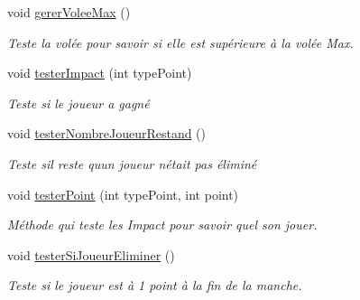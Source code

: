 \begin{DoxyCompactItemize}
void \hyperlink{class_darts_a1bd32af08207f7465f2973821a25dbae}{gerer\+Volee\+Max} ()
\begin{DoxyCompactList}\small\item\em Teste la volée pour savoir si elle est supérieure à la volée Max. \end{DoxyCompactList}\item 
void \hyperlink{class_darts_af34338eccf367fb9ed939ff95768a221}{tester\+Impact} (int type\+Point)
\begin{DoxyCompactList}\small\item\em Teste si le joueur a gagné \end{DoxyCompactList}\item 
void \hyperlink{class_darts_a0fbfcd2202600e886177e2202a44b3bd}{tester\+Nombre\+Joueur\+Restand} ()
\begin{DoxyCompactList}\small\item\em Teste s\textquotesingle{}il reste qu\textquotesingle{}un joueur n\textquotesingle{}était pas éliminé \end{DoxyCompactList}\item 
void \hyperlink{class_darts_a7244911a7b1fe50023987a1c802a5103}{tester\+Point} (int type\+Point, int point)
\begin{DoxyCompactList}\small\item\em Méthode qui teste les Impact pour savoir quel son jouer. \end{DoxyCompactList}\item 
void \hyperlink{class_darts_a0b01c46befe8ee6c1c61b79b0fd817f8}{tester\+Si\+Joueur\+Eliminer} ()
\begin{DoxyCompactList}\small\item\em Teste si le joueur est à 1 point à la fin de la manche. \end{DoxyCompactList}\end{DoxyCompactItemize}
